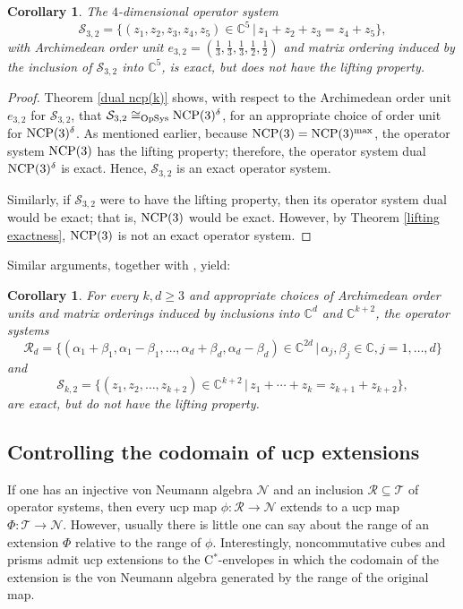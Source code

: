 \documentclass{amsart}
\newtheorem{corollary}[theorem]{Corollary}
\theoremstyle{definition}
\theoremstyle{remark}
\newcommand\osr{{\mathcal R}}
\newcommand\ost{{\mathcal T}}
\numberwithin{equation}{section}
\begin{document}
\begin{corollary}
	The $4$-dimensional operator system
\[
\mathcal S_{3,2}=\{(z_1,z_2,z_3,z_4,z_5)\in\mathbb C^5 \,|\, z_1+z_2+z_3=z_4+z_5\},
\]
with Archimedean order unit $e_{3,2}=(\frac{1}{3}, \frac{1}{3}, \frac{1}{3}, \frac{1}{2}, \frac{1}{2})$ and matrix ordering induced by the
inclusion of $\mathcal S_{3,2}$ into $\mathbb C^5$,
is exact, but does not have the lifting property.
\end{corollary}
\begin{proof}
Theorem \ref{dual ncp(k)} shows, with respect to the Archimedean order unit $e_{3,2}$ for $\mathcal S_{3,2}$, that
$\mathcal S_{3,2}\cong_{\textrm{OpSys}}\mbox{\textrm{NCP}}(3)^\delta$, for an 
appropriate choice of order unit for $\mbox{\textrm{NCP}}(3)^\delta$. As mentioned earlier, because
$\mbox{\textrm{NCP}}(3)=\mbox{\textrm{NCP}}(3)^{\textrm{max}}$, the operator system $\mbox{\textrm{NCP}}(3)$ has the lifting property; 
therefore, the operator system 
dual $\mbox{\textrm{NCP}}(3)^\delta$ is exact.
Hence, $\mathcal S_{3,2}$ is an
exact operator system.

Similarly, if $\mathcal S_{3,2}$ were to have the lifting property, then
its operator system dual would be exact; that is,
$\mbox{\textrm{NCP}}(3)$ would be exact. However, by Theorem \ref{lifting exactness}, 
$\mbox{\textrm{NCP}}(3)$ is not an exact operator system.
\end{proof}

Similar arguments, together with \cite[Theorem 5.9]{farenick--kavruk--paulsen--todorov2018}, yield:

\begin{corollary}
For every $k,d\geq 3$ and appropriate choices of Archimedean order units and matrix orderings induced by inclusions
into $\mathbb C^d$ and $\mathbb C^{k+2}$, the operator systems  
\[
\mathcal R_d=\{(\alpha_1+\beta_1, \alpha_1-\beta_1,\dots,\alpha_d+\beta_d,\alpha_d-\beta_d) \in\mathbb C^{2d}\,|\, \alpha_j,\beta_j\in\mathbb C, j=1,\dots,d\}
\]
and
\[
\mathcal S_{k,2}=\{(z_1,z_2,\dots,z_{k+2})\in\mathbb C^{k+2} \,|\, z_1+\cdots+z_{k}=z_{k+1}+z_{k+2}\},
\]
are exact, but
do not have the lifting property.
\end{corollary}


 \subsection{Controlling the codomain of ucp extensions}
 
 If one has an injective von Neumann algebra $\mathcal N$ and an inclusion $\osr\subseteq\ost$ of operator systems,
 then every ucp map $\phi:\osr\rightarrow\mathcal N$ extends to a ucp map $\Phi:\ost\rightarrow\mathcal N$. However, usually there
 is little one can say about the range of an extension $\Phi$ relative to the range of $\phi$. Interestingly, noncommutative cubes and prisms
 admit ucp extensions to the C$^*$-envelopes in which the codomain of the extension is the von Neumann algebra generated by the range of
 the original map.
 
\end{document}
